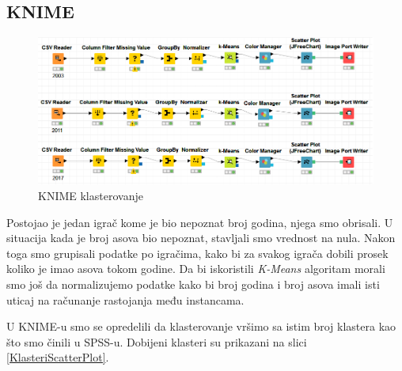 \documentclass[a4paper]{article}
\begin{document}
\subsection{KNIME}

\begin{figure}[H]
	\begin{center}
		\includegraphics[scale=0.60]{Klasterovanje/KNIME_Cvorovi.png}
	\end{center}
	\caption{KNIME klasterovanje}
	\label{fig:KNIME_CvoroviKlasterovanje}
\end{figure}

Postojao je jedan igrač kome je bio nepoznat broj godina, njega smo obrisali. U situacija kada je broj asova bio nepoznat, stavljali smo vrednost na nula. Nakon toga smo grupisali podatke po igračima, kako bi za svakog igrača dobili prosek koliko je imao asova tokom godine. Da bi iskoristili \textit{K-Means} algoritam morali smo još da normalizujemo podatke kako bi broj godina i broj asova imali isti uticaj na računanje rastojanja među instancama.  

U KNIME-u smo se opredelili da klasterovanje vršimo sa istim broj klastera kao što smo činili u SPSS-u. Dobijeni klasteri su prikazani na slici \ref{KlasteriScatterPlot}.
\end{document}
